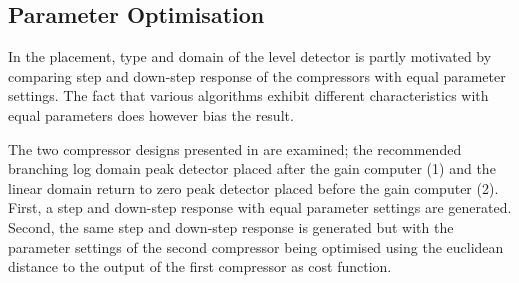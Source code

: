 \documentclass[../main2.tex]{subfiles}
\begin{document}
\subsection{Parameter Optimisation}\label{method_param_opt}
In \cite{reiss2012tutorial} the placement, type and domain of the level detector is partly motivated by comparing step and down-step response of the compressors with equal parameter settings. The fact that various algorithms exhibit different characteristics with equal parameters does however bias the result. 

The two compressor designs presented in \cite{reiss2012} are examined; the recommended branching log domain peak detector placed after the gain computer (1) and the linear domain return to zero peak detector placed before the gain computer (2). First, a step and down-step response with equal parameter settings are generated. Second, the same step and down-step response is generated but with the parameter  settings of the second compressor being optimised using the euclidean distance to the output of the first compressor as cost function. 
\end{document}

